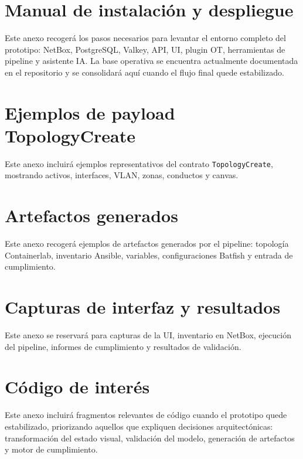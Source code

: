 \begin{appendices}
\appendix
\clearpage
\addappheadtotoc
\appendixpage
\chapter{Manual de instalación y despliegue} \label{ch:anexo-instalacion}

Este anexo recogerá los pasos necesarios para levantar el entorno completo del prototipo: NetBox, PostgreSQL, Valkey, API, UI, plugin OT, herramientas de pipeline y asistente IA. La base operativa se encuentra actualmente documentada en el repositorio y se consolidará aquí cuando el flujo final quede estabilizado.

\chapter{Ejemplos de payload TopologyCreate} \label{ch:anexo-payload}

Este anexo incluirá ejemplos representativos del contrato \texttt{TopologyCreate}, mostrando activos, interfaces, VLAN, zonas, conductos y canvas.

\chapter{Artefactos generados} \label{ch:anexo-artefactos}

Este anexo recogerá ejemplos de artefactos generados por el pipeline: topología Containerlab, inventario Ansible, variables, configuraciones Batfish y entrada de cumplimiento.

\chapter{Capturas de interfaz y resultados} \label{ch:anexo-capturas}

Este anexo se reservará para capturas de la UI, inventario en NetBox, ejecución del pipeline, informes de cumplimiento y resultados de validación.

\chapter{Código de interés} \label{ch:anexo-codigo}

Este anexo incluirá fragmentos relevantes de código cuando el prototipo quede estabilizado, priorizando aquellos que expliquen decisiones arquitectónicas: transformación del estado visual, validación del modelo, generación de artefactos y motor de cumplimiento.

\end{appendices}
